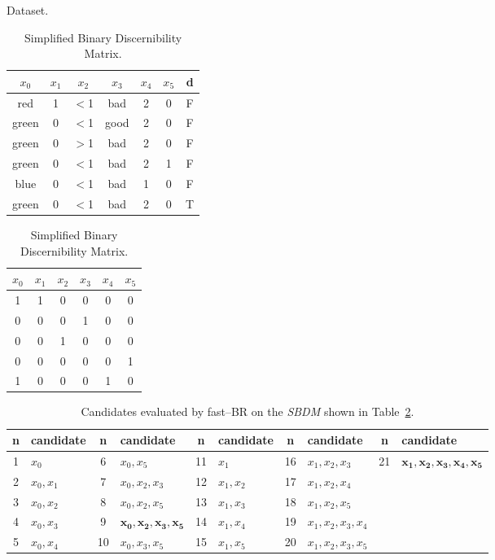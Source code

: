 \documentclass[citenumber]{elsarticle}
\begin{document}
	\begin{table}[htb]
		\begin{minipage}{.4\linewidth}
			\caption{Dataset.} \label{tab:dataset}
			\centering
			\setlength{\tabcolsep}{3pt}
		 	\begin{tabular}{cccccc|c}
		 		$x_0$ & $x_1$ & $x_2$ & $x_3$ & $x_4$ & $x_5$ & d \\
		 		\hline
				red   & 1 & $<$1 & bad  & 2 & 0 & F \\
				green & 0 & $<$1 & good & 2 & 0 & F \\
				green & 0 & $>$1 & bad  & 2 & 0 & F \\
				green & 0 & $<$1 & bad  & 2 & 1 & F \\
				blue  & 0 & $<$1 & bad  & 1 & 0 & F \\
				green & 0 & $<$1 & bad  & 2 & 0 & T
		 	\end{tabular}       
		\end{minipage}  
		\begin{minipage}{.59\linewidth}
			\caption{Simplified Binary Discernibility Matrix.} \label{tab:SBDM}
			\centering
			\begin{tabular}{cccccc}
				$x_0$ & $x_1$ & $x_2$ & $x_3$ & $x_4$ & $x_5$ \\
				\hline
				1 & 1 & 0 & 0 & 0 & 0 \\
				0 & 0 & 0 & 1 & 0 & 0 \\
				0 & 0 & 1 & 0 & 0 & 0 \\
				0 & 0 & 0 & 0 & 0 & 1 \\
				1 & 0 & 0 & 0 & 1 & 0
			\end{tabular}       
			\bigskip
		\end{minipage}    
 	\end{table}
 
 \begin{table}[htb]
 		\caption{Candidates evaluated by fast--BR on the \textit{SBDM} shown in Table~\ref{tab:SBDM}.} \label{tab:cand}
 		\footnotesize
 		\centering
 		\setlength{\tabcolsep}{3pt}
 	 	\begin{tabular}{cl|cl|cl|cl|cl}
 	 		n & candidate & n & candidate & n & candidate & n & candidate & n & candidate \\
 	 		\hline
			1 & ${x_0}$     & 6  & ${x_0,x_5}$         & 11 & ${x_1}$     & 16 & ${x_1,x_2,x_3}$     & 21 & $\mathbf{{x_1,x_2,x_3,x_4,x_5}}$  \\
			2 & ${x_0,x_1}$ & 7  & ${x_0,x_2,x_3}$     & 12 & ${x_1,x_2}$ & 17 & ${x_1,x_2,x_4}$     &   \\
			3 & ${x_0,x_2}$ & 8  & ${x_0,x_2,x_5}$     & 13 & ${x_1,x_3}$ & 18 & ${x_1,x_2,x_5}$     &   \\
			4 & ${x_0,x_3}$ & 9  & $\mathbf{{x_0,x_2,x_3,x_5}}$ & 14 & ${x_1,x_4}$ & 19 & ${x_1,x_2,x_3,x_4}$ &   \\
			5 & ${x_0,x_4}$ & 10 & ${x_0,x_3,x_5}$     & 15 & ${x_1,x_5}$ & 20 & ${x_1,x_2,x_3,x_5}$ &       
 	 	\end{tabular}             
  	\end{table}	
 	
\end{document}
